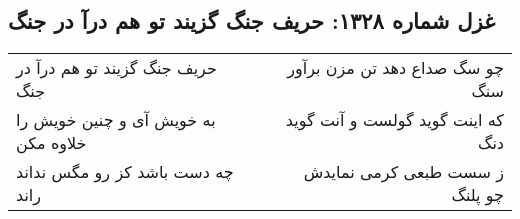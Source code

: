\begin{center}
\section*{غزل شماره ۱۳۲۸: حریف جنگ گزیند تو هم درآ در جنگ}
\label{sec:1328}
\begin{longtable}{l p{0.5cm} r}
حریف جنگ گزیند تو هم درآ در جنگ
&&
چو سگ صداع دهد تن مزن برآور سنگ
\\
به خویش آی و چنین خویش را خلاوه مکن
&&
که اینت گوید گولست و آنت گوید دنگ
\\
چه دست باشد کز رو مگس نداند راند
&&
ز سست طبعی کرمی نمایدش چو پلنگ
\\
\end{longtable}
\end{center}
